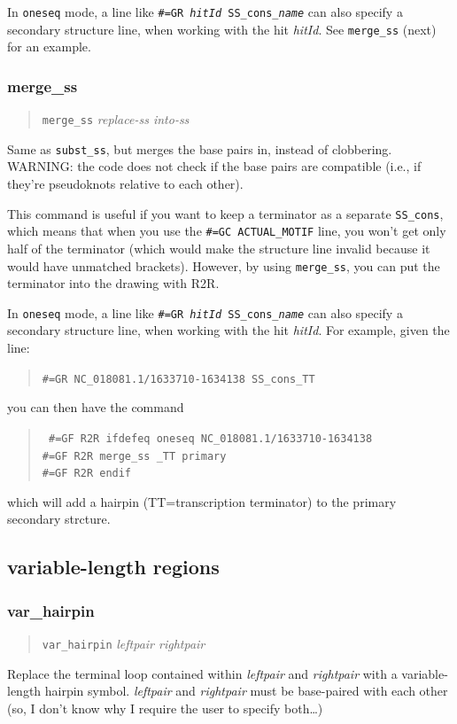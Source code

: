 \documentclass[letterpaper,12pt]{report}
\newcommand{\example}[1]{
\begin{quote}
{\raggedright
#1
}
\end{quote}
}
\newcommand{\examplett}[1]{
\example{{\tt #1}}
}
\begin{document}
In {\tt oneseq} mode, a line like {\tt \#=GR {\it hitId} SS\_cons\_{\it name}} can also specify a secondary structure line, when working with the hit {\it hitId}.  See {\tt merge\_ss} (next) for an example.

\subsubsection{merge\_ss}
\example{{\tt merge\_ss}  \textit{replace-ss  into-ss}}

Same as {\tt subst\_ss}, but merges the base pairs in, instead of clobbering. 
WARNING: the code does not check if the base pairs are compatible
(i.e., if they{\textquoteright}re pseudoknots relative to each other).

This command is useful if you want to keep a terminator as a separate
{\tt SS\_cons}, which means that when you use the {\tt \#=GC ACTUAL\_MOTIF} line,
you won{\textquoteright}t get only half of the terminator
(which would make the structure line invalid because it would have
unmatched brackets).  However, by
using {\tt merge\_ss}, you can put the terminator into the drawing with
R2R.

In {\tt oneseq} mode, a line like {\tt \#=GR {\it hitId} SS\_cons\_{\it name}} can also specify a secondary structure line, when working with the hit {\it hitId}.  For example, given the line:
\examplett{\#=GR NC\_018081.1/1633710-1634138 SS\_cons\_TT}
you can then have the command
\examplett{
\#=GF R2R ifdefeq oneseq NC\_018081.1/1633710-1634138\\
\#=GF R2R merge\_ss \_TT primary\\
\#=GF R2R endif
}
which will add a hairpin (TT=transcription terminator) to the primary secondary strcture.

\subsection{variable-length regions}
\label{sec:varlen}

\subsubsection{var\_hairpin}
\example{{\tt var\_hairpin}   \textit{leftpair  rightpair}}

Replace the terminal loop contained within \textit{leftpair } and
\textit{rightpair} with a variable-length hairpin symbol. 
\textit{leftpair} and \textit{rightpair} must be base-paired with each
other (so, I don{\textquoteright}t know why I require the user to
specify both{\dots})
\end{document}
